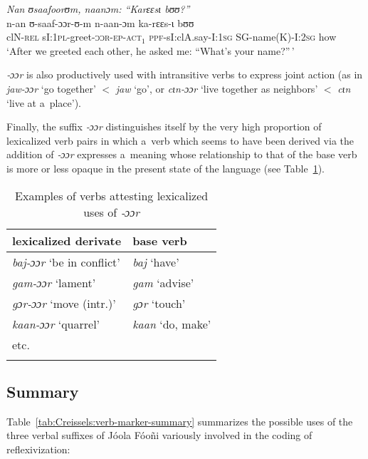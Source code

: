 \documentclass[output=paper]{langscibook}
\begin{document}
    \ex\label{ex:Creissels:41b}
      \textit{Nan ʊsaafoorʊm, naanɔm: ``Karɛɛsɩ bʊʊ?''}\\
      \gll n-an ʊ-saaf-ɔɔr-ʊ-m n-aan-ɔm ka-rɛɛs-ɩ bʊʊ\\
      clN-\textsc{rel} sI:\textsc{1pl}-greet-\textsc{ɔɔr-ep-act$_1$}
      \textsc{ppf}-sI:clA.say-I:\textsc{1sg} SG-name(K)-I:\textsc{2sg} how\\
      \glt `After we greeted each other, he asked me: ``What's your name?''\,'

  \z
\z

\textit{‑ɔɔr} is also productively used with intransitive verbs to express joint
action (as in \textit{jaw-ɔɔr} `go together' $<$ \textit{jaw} `go', or
\textit{cɩn-ɔɔr} `live together as neighbors' $<$ \textit{cɩn} `live at a~place').

Finally, the suffix \textit{‑ɔɔr} distinguishes itself by the very high
proportion of lexicalized verb pairs in which a~verb which seems to have been
derived via the addition of \textit{‑ɔɔr} expresses a~meaning whose relationship
to that of the base verb is more or less opaque in the present state of the
language (see Table~\ref{tab:Creissels:lexicalized-oor}).

\begin{table}[ht]
  \centering
  \begin{tabular}{ll}
    \lsptoprule
    {lexicalized derivate} &  {base verb} \\
    \hline
    \textit{baj-ɔɔr} `be in conflict' & \textit{baj} `have' \\
    \textit{gam-ɔɔr} `lament' & \textit{gam} `advise' \\
    \textit{gɔr-ɔɔr} `move (intr.)' & \textit{gɔr} `touch' \\
    \textit{kaan-ɔɔr} `quarrel' & \textit{kaan} `do, make' \\
    etc. & \\
    \lspbottomrule
  \end{tabular}
  \caption{Examples of verbs attesting lexicalized uses of \textit{‑ɔɔr}}%
  \label{tab:Creissels:lexicalized-oor}
\end{table}

\subsection{Summary}%
\label{sec:Creissels:verb-marker-summary}

Table~\ref{tab:Creissels:verb-marker-summary} summarizes the possible uses of the
three verbal suffixes of Jóola Fóoñi variously involved in the coding of
reflexivization:
\end{document}
